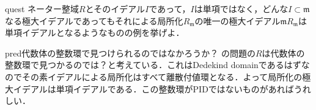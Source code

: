 \documentclass[11pt]{jsarticle}
\newcommand{\mf}[1]{\mathfrak{#1}} %
\begin{document}
\begin{statesp}[nagata]{quest}{}
    ネーター整域$R$とそのイデアル$I$であって，$I$は単項ではなく，どんな$I \subset \mf{m}$なる極大イデアルであってもそれによる局所化$R_{\mf{m}}$の唯一の極大イデアル$\mf{m}R_{\mf{m}}$は単項イデアルとなるようなものの例を挙げよ．
\end{statesp}
\begin{statesp}{pred}{代数体の整数環で見つけられるのではなかろうか？}
    の問題の$R$は代数体の整数環で見つかるのでは？と考えている．これはDedekind domainであるはずなのでその素イデアルによる局所化はすべて離散付値環となる．よって局所化の極大イデアルは単項イデアルである．この整数環がPIDではないものがあればうれしい．
\end{statesp}
\end{document}
